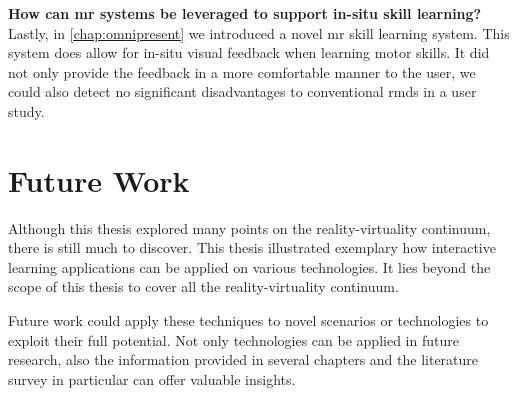 \textbf{How can \acrlong{mr} systems be leveraged to support in-situ skill learning?}\\
Lastly, in \autoref{chap:omnipresent} we introduced a novel \acrshort{mr} skill learning system. This system does allow for in-situ visual feedback when learning motor skills. It did not only provide the feedback in a more comfortable manner to the user, we could also detect no significant disadvantages to conventional \acrshort{rmd}s in a user study.


\section{Future Work}
\label{sec:conclusion:future}

Although this thesis explored many points on the reality-virtuality continuum, there is still much to discover. This thesis illustrated exemplary how interactive learning applications can be applied on various technologies. It lies beyond the scope of this thesis to cover all the reality-virtuality continuum.

Future work could apply these techniques to novel scenarios or technologies to exploit their full potential. Not only technologies can be applied in future research, also the information provided in several chapters and the literature survey in particular can offer valuable insights.
